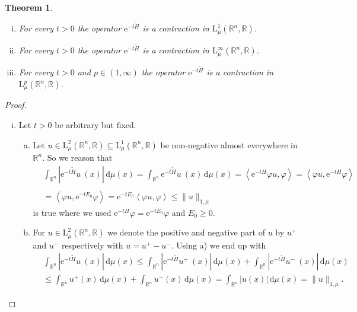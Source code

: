 \documentclass[12pt,longbibliography]{article}
\def\R{\mathbb{R}}
\def\d{\,\mathrm{d}}
\newtheorem{thm}{Theorem}[section]
\theoremstyle{definition}
\theoremstyle{remark}
\theoremstyle{example}
\begin{document}
\begin{thm}\label{Contraction_weightedSemigroup} \ 
\begin{enumerate}[i.)]
\item For every $t > 0$ the operator $\mathrm{e}^{-t\tilde{H}}$ is a contraction in $\mathrm{L}_{\mu}^{1}(\R^{n}, \R)$.
\item For every $t > 0$ the operator $\mathrm{e}^{-t\tilde{H}}$ is a contraction in $\mathrm{L}_{\mu}^{\infty}(\R^{n}, \R)$.
\item For every $t>0$ and $p \in (1,\infty)$ the operator $\mathrm{e}^{-t\tilde{H}}$ is a contraction in 
$\mathrm{L}_{\mu}^{p}(\R^{n}, \R)$.
\end{enumerate}
\end{thm}

\begin{proof} \
\begin{enumerate}[i.)]
\item Let $t > 0$ be arbitrary but fixed.
\begin{enumerate}[a)]
\item Let $u \in \mathrm{L}_{\mu}^{2}(\R^{n}, \R) \subseteq \mathrm{L}_{\mu}^{1}(\R^{n}, \R)$ be non-negative almost everywhere 
in $\R^{n}$. So we reason that
\begin{align*}
& \int_{\R^{n}} |\mathrm{e}^{-t\tilde{H}}u  \ (x)| \d \mu (x) 
= \int_{\R^{n}} \mathrm{e}^{-t\tilde{H}}u \ (x) \d \mu (x) = \left\langle  \mathrm{e}^{-tH} \varphi u, \varphi \right\rangle 
= \left\langle \varphi u,  \mathrm{e}^{-tH} \varphi \right\rangle \\
& \\
& =  \left\langle \varphi u,   \mathrm{e}^{-tE_{0}} \varphi \right\rangle 
=  \mathrm{e}^{-tE_{0}} \left\langle \varphi u,  \varphi \right\rangle \leq \| u \|_{1,\mu} 
\end{align*}
is true where we used $\mathrm{e}^{-tH} \varphi = \mathrm{e}^{-tE_{0}} \varphi$ and $E_{0} \geq 0$.
\item For $u \in \mathrm{L}_{\mu}^{2}(\R^{n}, \R)$ we denote the positive and negative part of $u$
by $u^{+}$ and $u^{-}$ respectively with $u = u^{+} - u^{-}$. Using a) we end up with
\begin{align*}
& \int_{\R^{n}} |\mathrm{e}^{-t\tilde{H}}u \ (x)| \d \mu (x) 
\leq \int_{\R^{n}} |\mathrm{e}^{-t\tilde{H}}u^{+} \ (x)| \d \mu (x) 
+ \int_{\R^{n}} |\mathrm{e}^{-t\tilde{H}}u^{-} \ (x)| \d \mu (x) \\
& \leq \int_{\R^{n}} u^{+} (x) \d \mu (x) + \int_{\R^{n}} u^{-} (x) \d \mu (x) 
 = \int_{\R^{n}} |u (x)| \d \mu (x) = \| u \|_{1,\mu}.

\end{align*}
\end{enumerate}
\end{enumerate}
\end{proof}
\end{document}
